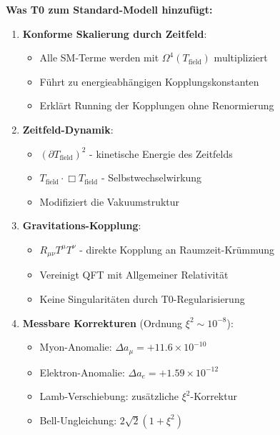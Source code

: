 \documentclass[12pt,a4paper]{article}
\begin{document}
	\textbf{Was T0 zum Standard-Modell hinzufügt:}
	
	\begin{tcolorbox}[colback=blue!5!white,colframe=blue!75!black,title=T0-Beiträge zur erweiterten Lagrange-Dichte]
		\begin{enumerate}
			\item \textbf{Konforme Skalierung durch Zeitfeld}:
			\begin{itemize}
				\item Alle SM-Terme werden mit $\Omega^4(T_{\text{field}})$ multipliziert
				\item Führt zu energieabhängigen Kopplungskonstanten
				\item Erklärt Running der Kopplungen ohne Renormierung
			\end{itemize}
			
			\item \textbf{Zeitfeld-Dynamik}:
			\begin{itemize}
				\item $(\partial T_{\text{field}})^2$ - kinetische Energie des Zeitfelds
				\item $T_{\text{field}} \cdot \Box T_{\text{field}}$ - Selbstwechselwirkung
				\item Modifiziert die Vakuumstruktur
			\end{itemize}
			
			\item \textbf{Gravitations-Kopplung}:
			\begin{itemize}
				\item $R_{\mu\nu} T^{\mu} T^{\nu}$ - direkte Kopplung an Raumzeit-Krümmung
				\item Vereinigt QFT mit Allgemeiner Relativität
				\item Keine Singularitäten durch T0-Regularisierung
			\end{itemize}
			
			\item \textbf{Messbare Korrekturen} (Ordnung $\xi^2 \sim 10^{-8}$):
			\begin{itemize}
				\item Myon-Anomalie: $\Delta a_{\mu} = +11.6 \times 10^{-10}$
				\item Elektron-Anomalie: $\Delta a_{e} = +1.59 \times 10^{-12}$
				\item Lamb-Verschiebung: zusätzliche $\xi^2$-Korrektur
				\item Bell-Ungleichung: $2\sqrt{2}(1 + \xi^2)$
			\end{itemize}
		\end{enumerate}
	\end{tcolorbox}
	
\end{document}
